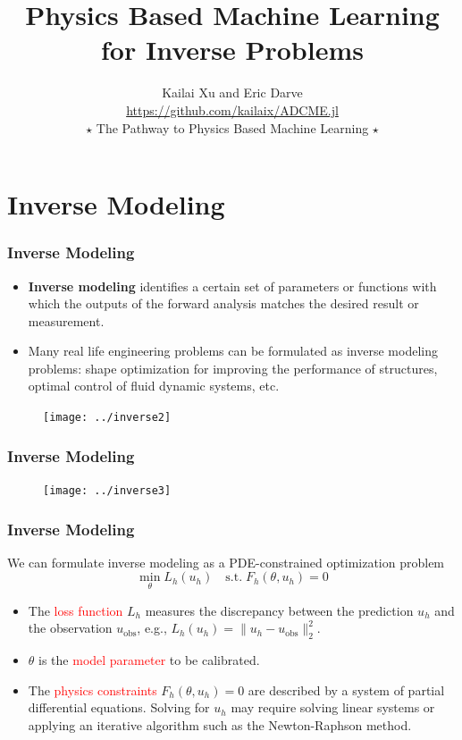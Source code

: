 \documentclass{beamer}
\title[Physics Based Machine Learning]{Physics Based Machine Learning for Inverse Problems} %
\author[ADCME]{Kailai Xu and Eric Darve\\\quad\url{https://github.com/kailaix/ADCME.jl} \qquad      \\ $\star$ The Pathway to Physics Based Machine Learning $\star$} %
\date{}%
\begin{document}
\begin{frame}

\titlepage %

\end{frame}
\usebackgroundtemplate{}

\section{Inverse Modeling}



\begin{frame}
	\frametitle{Inverse Modeling}
	\begin{itemize}
		\item \textbf{Inverse modeling} identifies a certain set of parameters or functions with which the outputs of the forward analysis matches the desired result or measurement.
		\item Many real life engineering problems can be formulated as inverse modeling problems: shape optimization for improving the performance of structures, optimal control of fluid dynamic systems, etc.
	\end{itemize}
	\begin{figure}[hbt]
	\centering
  \texttt{[image: ../inverse2]}
\end{figure}
\end{frame}

\begin{frame}
	\frametitle{Inverse Modeling}
	\begin{figure}
	\centering
  \texttt{[image: ../inverse3]}
\end{figure}
\end{frame}

\begin{frame}
	\frametitle{Inverse Modeling}
	We can formulate inverse modeling as a PDE-constrained optimization problem 
	\begin{equation*}
		\min_{\theta} L_h(u_h) \quad \mathrm{s.t.}\; F_h(\theta, u_h) = 0
	\end{equation*}
	\begin{itemize}
		\item The \textcolor{red}{loss function} $L_h$ measures the discrepancy between the prediction $u_h$ and the observation $u_{\mathrm{obs}}$, e.g., $L_h(u_h) = \|u_h - u_{\mathrm{obs}}\|_2^2$. 
		\item $\theta$ is the \textcolor{red}{model parameter} to be calibrated. 
		\item The \textcolor{red}{physics constraints} $F_h(\theta, u_h)=0$ are described by a system of partial differential equations. Solving for $u_h$ may require solving linear systems or applying an iterative algorithm such as the Newton-Raphson method. 
	\end{itemize}
\end{frame}
\end{document}
